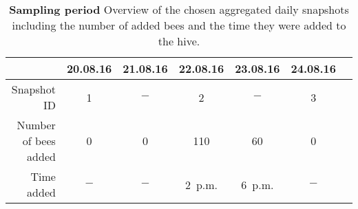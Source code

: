 \begin{table}[htb]
\small
\centering
\caption[Sampling period]{\textbf{Sampling period} Overview of the chosen aggregated daily snapshots including the number of added bees and the time they were added to the hive.}
\vspace*{5mm}
\begin{tabularx}{\textwidth}{rcccccc}
\toprule
{} & 20.08.16 & 21.08.16 & 22.08.16 & 23.08.16 & 24.08.16 \\
\midrule
Snapshot ID & 1 & $-$ & 2 & $-$ & 3 & \\
Number of bees added & 0 & 0 & 110 & 60 & 0 \\
Time added & $-$ & $-$ & 2~p.m. & 6~p.m. & $-$ \\
\bottomrule
\end{tabularx}
\label{tab:networks}
\end{table}